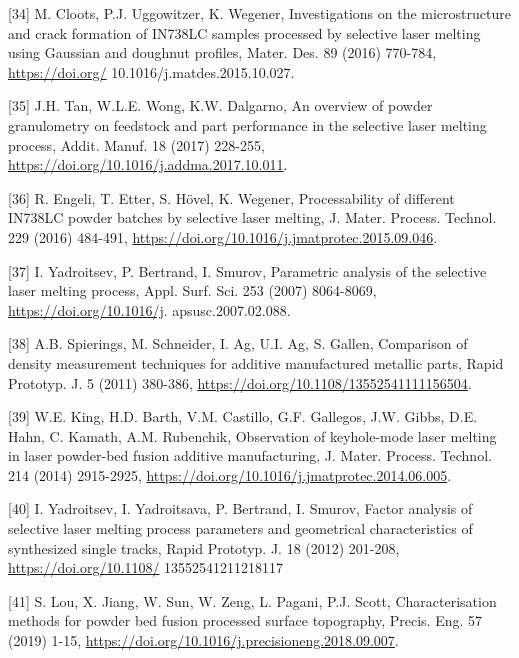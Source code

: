 \documentclass[10pt]{article}
\begin{document}
[34] M. Cloots, P.J. Uggowitzer, K. Wegener, Investigations on the microstructure and crack formation of IN738LC samples processed by selective laser melting using Gaussian and doughnut profiles, Mater. Des. 89 (2016) 770-784, \href{https://doi.org/}{https://doi.org/} 10.1016/j.matdes.2015.10.027.

[35] J.H. Tan, W.L.E. Wong, K.W. Dalgarno, An overview of powder granulometry on feedstock and part performance in the selective laser melting process, Addit. Manuf. 18 (2017) 228-255, \href{https://doi.org/10.1016/j.addma.2017.10.011}{https://doi.org/10.1016/j.addma.2017.10.011}.

[36] R. Engeli, T. Etter, S. Hövel, K. Wegener, Processability of different IN738LC powder batches by selective laser melting, J. Mater. Process. Technol. 229 (2016) 484-491, \href{https://doi.org/10.1016/j.jmatprotec.2015.09.046}{https://doi.org/10.1016/j.jmatprotec.2015.09.046}.

[37] I. Yadroitsev, P. Bertrand, I. Smurov, Parametric analysis of the selective laser melting process, Appl. Surf. Sci. 253 (2007) 8064-8069, \href{https://doi.org/10.1016/j}{https://doi.org/10.1016/j}. apsusc.2007.02.088.

[38] A.B. Spierings, M. Schneider, I. Ag, U.I. Ag, S. Gallen, Comparison of density measurement techniques for additive manufactured metallic parts, Rapid Prototyp. J. 5 (2011) 380-386, \href{https://doi.org/10.1108/13552541111156504}{https://doi.org/10.1108/13552541111156504}.

[39] W.E. King, H.D. Barth, V.M. Castillo, G.F. Gallegos, J.W. Gibbs, D.E. Hahn, C. Kamath, A.M. Rubenchik, Observation of keyhole-mode laser melting in laser powder-bed fusion additive manufacturing, J. Mater. Process. Technol. 214 (2014) 2915-2925, \href{https://doi.org/10.1016/j.jmatprotec.2014.06.005}{https://doi.org/10.1016/j.jmatprotec.2014.06.005}.

[40] I. Yadroitsev, I. Yadroitsava, P. Bertrand, I. Smurov, Factor analysis of selective laser melting process parameters and geometrical characteristics of synthesized single tracks, Rapid Prototyp. J. 18 (2012) 201-208, \href{https://doi.org/10.1108/}{https://doi.org/10.1108/} 13552541211218117

[41] S. Lou, X. Jiang, W. Sun, W. Zeng, L. Pagani, P.J. Scott, Characterisation methods for powder bed fusion processed surface topography, Precis. Eng. 57 (2019) 1-15, \href{https://doi.org/10.1016/j.precisioneng.2018.09.007}{https://doi.org/10.1016/j.precisioneng.2018.09.007}.
\end{document}
